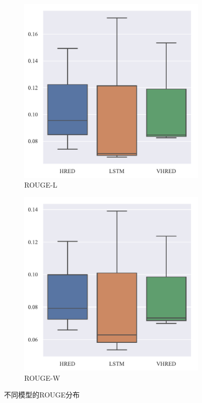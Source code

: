 \begin{figure}[H]
\begin{subfigure}{0.5\linewidth}
        \includegraphics[width=0.8\linewidth]{figure/boxplot/model/rouge_l/plot.pdf}
        \caption{ROUGE-L}
    \end{subfigure}%
    \begin{subfigure}{0.5\linewidth}
        \centering
        \includegraphics[width=0.8\linewidth]{figure/boxplot/model/rouge_w/plot.pdf}
        \caption{ROUGE-W}
    \end{subfigure}
    \centering
    \caption{不同模型的ROUGE分布}
    \label{fig:ROUGE_model}
\end{figure}
